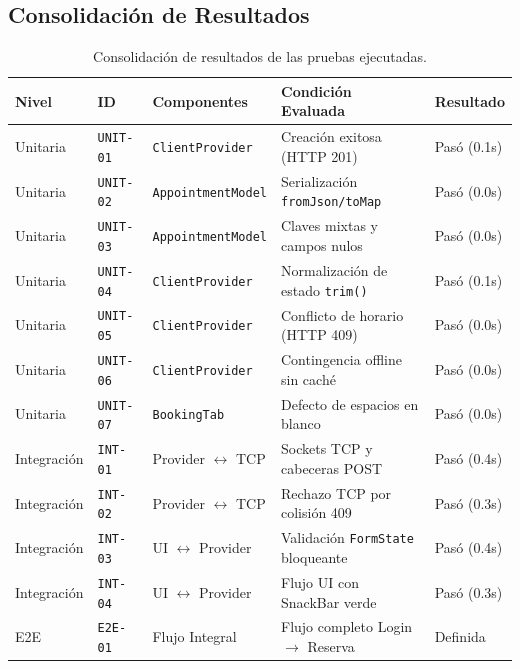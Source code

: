 \documentclass[11pt,a4paper]{article}
\begin{document}
\subsection{Consolidación de Resultados}

\begin{table}[htbp]
\centering
\small
\begin{tabularx}{\textwidth}{p{2.0cm}p{1.8cm}p{3.2cm}Xp{1.8cm}}
\toprule
\textbf{Nivel} & \textbf{ID} & \textbf{Componentes} & \textbf{Condición Evaluada} & \textbf{Resultado} \\
\midrule
Unitaria & \texttt{UNIT-01} & \texttt{ClientProvider} & Creación exitosa (HTTP 201) & Pasó (0.1s) \\
Unitaria & \texttt{UNIT-02} & \texttt{AppointmentModel} & Serialización \texttt{fromJson/toMap} & Pasó (0.0s) \\
Unitaria & \texttt{UNIT-03} & \texttt{AppointmentModel} & Claves mixtas y campos nulos & Pasó (0.0s) \\
Unitaria & \texttt{UNIT-04} & \texttt{ClientProvider} & Normalización de estado \texttt{trim()} & Pasó (0.1s) \\
Unitaria & \texttt{UNIT-05} & \texttt{ClientProvider} & Conflicto de horario (HTTP 409) & Pasó (0.0s) \\
Unitaria & \texttt{UNIT-06} & \texttt{ClientProvider} & Contingencia offline sin caché & Pasó (0.0s) \\
Unitaria & \texttt{UNIT-07} & \texttt{BookingTab} & Defecto de espacios en blanco & Pasó (0.0s) \\
Integración & \texttt{INT-01} & Provider $\leftrightarrow$ TCP & Sockets TCP y cabeceras POST & Pasó (0.4s) \\
Integración & \texttt{INT-02} & Provider $\leftrightarrow$ TCP & Rechazo TCP por colisión 409 & Pasó (0.3s) \\
Integración & \texttt{INT-03} & UI $\leftrightarrow$ Provider & Validación \texttt{FormState} bloqueante & Pasó (0.4s) \\
Integración & \texttt{INT-04} & UI $\leftrightarrow$ Provider & Flujo UI con SnackBar verde & Pasó (0.3s) \\
E2E & \texttt{E2E-01} & Flujo Integral & Flujo completo Login $\rightarrow$ Reserva & Definida \\
\bottomrule
\end{tabularx}
\caption{Consolidación de resultados de las pruebas ejecutadas.}
\label{tab:consolidacion}
\end{table}
\end{document}
